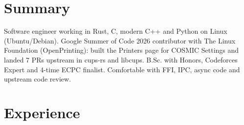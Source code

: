 \documentclass[10pt]{article}
\begin{document}

\section*{Summary}
Software engineer working in Rust, C, modern C++ and Python on Linux (Ubuntu/Debian). Google Summer of Code 2026 contributor with The Linux Foundation (OpenPrinting): built the Printers page for COSMIC Settings and landed 7 PRs upstream in cups-rs and libcups. B.Sc. with Honors, Codeforces Expert and 4-time ECPC finalist. Comfortable with FFI, IPC, async code and upstream code review.

\section*{Experience}
\end{document}
